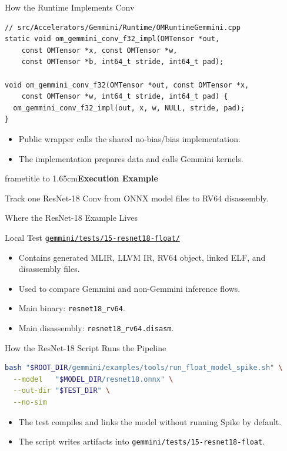 \documentclass[aspectratio=169,10pt]{beamer}
\newcommand{\code}[1]{\texttt{\footnotesize #1}}
\newcommand{\repoRoot}{/home/lahcen/toolchains/onnx-mlir-xcompile/onnx-mlir}
\newcommand{\pathcode}[1]{\href{run:\repoRoot/#1}{\texttt{\scriptsize #1}}}
\newcommand{\sectiondivider}[2]{
  \begin{frame}[plain]
    \vspace*{1.75cm}
    \begin{beamercolorbox}[wd=\paperwidth,ht=1.65cm,dp=0cm,center]{frametitle}
      \vbox to 1.65cm{\vfil{\Large\bfseries #1}\vfil}
    \end{beamercolorbox}
    \vspace{0.65cm}
    \begin{center}
      {\large #2}
    \end{center}
  \end{frame}
}
\begin{document}
\begin{frame}[fragile]{How the Runtime Implements Conv}
  \begin{lstlisting}
// src/Accelerators/Gemmini/Runtime/OMRuntimeGemmini.cpp
static void om_gemmini_conv_f32_impl(OMTensor *out,
    const OMTensor *x, const OMTensor *w,
    const OMTensor *b, int64_t stride, int64_t pad);

void om_gemmini_conv_f32(OMTensor *out, const OMTensor *x,
    const OMTensor *w, int64_t stride, int64_t pad) {
  om_gemmini_conv_f32_impl(out, x, w, NULL, stride, pad);
}
  \end{lstlisting}
  \begin{itemize}
    \item Public wrapper calls the shared no-bias/bias implementation.
    \item The implementation prepares data and calls Gemmini kernels.
  \end{itemize}
\end{frame}

\sectiondivider{Execution Example}{Track one ResNet-18 Conv from ONNX model files to RV64 disassembly.}

\begin{frame}{Where the ResNet-18 Example Lives}
  \begin{block}{Local Test}
    \pathcode{gemmini/tests/15-resnet18-float/}
  \end{block}
  \begin{itemize}
    \item Contains generated MLIR, LLVM IR, RV64 object, linked ELF, and disassembly files.
    \item Used to compare Gemmini and non-Gemmini inference flows.
    \item Main binary: \code{resnet18\_rv64}.
    \item Main disassembly: \code{resnet18\_rv64.disasm}.
  \end{itemize}
\end{frame}

\begin{frame}[fragile]{How the ResNet-18 Script Runs the Pipeline}
  \begin{lstlisting}[language=bash]
bash "$ROOT_DIR/gemmini/examples/tools/run_float_model_spike.sh" \
  --model   "$MODEL_DIR/resnet18.onnx" \
  --out-dir "$TEST_DIR" \
  --no-sim
  \end{lstlisting}
  \begin{itemize}
    \item The test compiles and links the model without running Spike by default.
    \item The script writes artifacts into \code{gemmini/tests/15-resnet18-float}.
  \end{itemize}
\end{frame}
\end{document}
